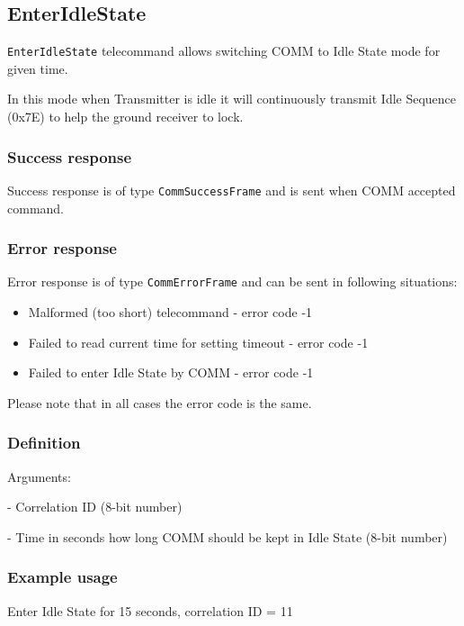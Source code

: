 \subsection{EnterIdleState}
\texttt{EnterIdleState} telecommand allows switching COMM to Idle State mode for given time.

In this mode when Transmitter is idle it will continuously transmit Idle Sequence (0x7E) to help the ground receiver to lock.

\subsubsection{Success response}
Success response is of type \texttt{CommSuccessFrame} and is sent when COMM accepted command. 

\subsubsection{Error response}
Error response is of type \texttt{CommErrorFrame} and can be sent in following situations:
\begin{itemize}
	\item Malformed (too short) telecommand - error code -1
	\item Failed to read current time for setting timeout - error code -1
	\item Failed to enter Idle State by COMM - error code -1
\end{itemize}
Please note that in all cases the error code is the same.

\subsubsection{Definition}

Arguments: 
\begin{description}[labelindent=1cm]
	\item[\texttt{correlation\_id}] - Correlation ID (8-bit number)
	\item[\texttt{duration}] - Time in seconds how long COMM should be kept in Idle State (8-bit number) 
\end{description}

\subsubsection{Example usage}
Enter Idle State for 15 seconds, correlation ID = 11


